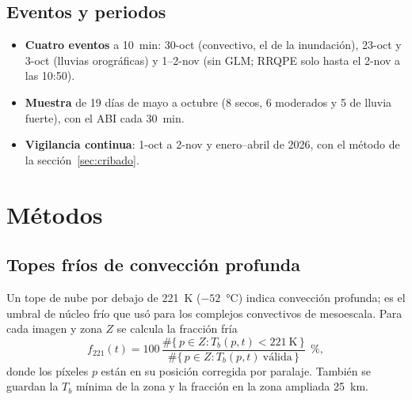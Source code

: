 \documentclass{sosg-informe}
\begin{document}
\subsection{Eventos y periodos}
\begin{itemize}
  \item \textbf{Cuatro eventos} a 10~min: 30-oct (convectivo, el de la inundación), 23-oct y 3-oct (lluvias orográficas) y 1--2-nov (sin GLM; RRQPE solo hasta el 2-nov a las 10:50).
  \item \textbf{Muestra} de 19 días de mayo a octubre (8 secos, 6 moderados y 5 de lluvia fuerte), con el ABI cada 30~min.
  \item \textbf{Vigilancia continua}: 1-oct a 2-nov y enero--abril de 2026, con el método de la sección~\ref{sec:cribado}.
\end{itemize}

\section{Métodos}

\subsection{Topes fríos de convección profunda}
Un tope de nube por debajo de 221~K ($-52$~°C) indica convección profunda; es el umbral de núcleo frío que \citet{maddox1980} usó para los complejos convectivos de mesoescala. Para cada imagen y zona $Z$ se calcula la fracción fría
\begin{equation}
  f_{221}(t) = 100\, \frac{\#\{\, p \in Z : T_b(p,t) < 221~\text{K} \,\}}{\#\{\, p \in Z : T_b(p,t)\ \text{válida} \,\}}\ \ \text{\%},
  \label{eq:frio}
\end{equation}
donde los píxeles $p$ están en su posición corregida por paralaje. También se guardan la $T_b$ mínima de la zona y la fracción en la zona ampliada 25~km.
\end{document}
